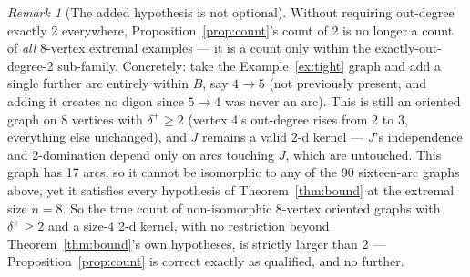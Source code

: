 \documentclass[11pt]{article}
\theoremstyle{plain}
\theoremstyle{definition}
\theoremstyle{remark}
\newtheorem*{remark}{Remark}
\begin{document}
\begin{remark}[The added hypothesis is not optional]
Without requiring out-degree exactly 2 everywhere, Proposition~\ref{prop:count}'s
count of 2 is no longer a count of \emph{all} 8-vertex extremal examples — it is a
count only within the exactly-out-degree-2 sub-family. Concretely: take the
Example~\ref{ex:tight} graph and add a single further arc entirely within $B$, say
$4 \to 5$ (not previously present, and adding it creates no digon since $5\to4$ was
never an arc). This is still an oriented graph on 8 vertices with $\delta^+ \ge 2$
(vertex 4's out-degree rises from 2 to 3, everything else unchanged), and $J$ remains
a valid 2-d kernel — $J$'s independence and 2-domination depend only on arcs
touching $J$, which are untouched. This graph has 17 arcs, so it cannot be
isomorphic to any of the 90 sixteen-arc graphs above, yet it satisfies every
hypothesis of Theorem~\ref{thm:bound} at the extremal size $n=8$. So the true count
of non-isomorphic 8-vertex oriented graphs with $\delta^+\ge2$ and a size-4 2-d kernel,
with no restriction beyond Theorem~\ref{thm:bound}'s own hypotheses, is strictly
larger than 2 — Proposition~\ref{prop:count} is correct exactly as qualified, and no
further.
\end{remark}
\end{document}
